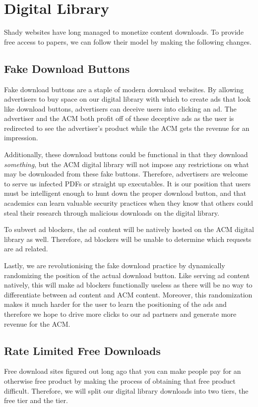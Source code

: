 \section{Digital Library}
Shady websites have long managed to monetize content downloads.
To provide free access to papers, we can follow their model by making the
following changes.

\subsection{Fake Download Buttons}
Fake download buttons are a staple of modern download websites.
By allowing advertisers to buy space on our digital library with which to
create ads that look like download buttons, advertisers can deceive users into
clicking an ad.
The advertiser and the ACM both profit off of these deceptive ads as the user
is redirected to see the advertiser's product while the ACM gets the revenue
for an impression.

Additionally, these download buttons could be functional in that they download
\textit{something}, but the ACM digital library will not impose any
restrictions on what may be downloaded from these fake buttons.
Therefore, advertisers are welcome to serve us infected PDFs or straight up
executables.
It is our position that users must be intelligent enough to hunt down the
proper download button, and that academics can learn valuable security
practices when they know that others could steal their research through
malicious downloads on the digital library.

To subvert ad blockers, the ad content will be natively hosted on the ACM
digital library as well.
Therefore, ad blockers will be unable to determine which requests are ad
related.

Lastly, we are revolutionising the fake download practice by dynamically
randomizing the position of the actual download button.
Like serving ad content natively, this will make ad blockers functionally
useless as there will be no way to differentiate between ad content and ACM
content.
Moreover, this randomization makes it much harder for the user to learn the
positioning of the ads and therefore we hope to drive more clicks to our ad
partners and generate more revenue for the ACM.

\subsection{Rate Limited Free Downloads}
Free download sites figured out long ago that you can make people pay for an
otherwise free product by making the process of obtaining that free product
difficult.
Therefore, we will split our digital library downloads into two tiers, the free
tier and the \premium tier.

